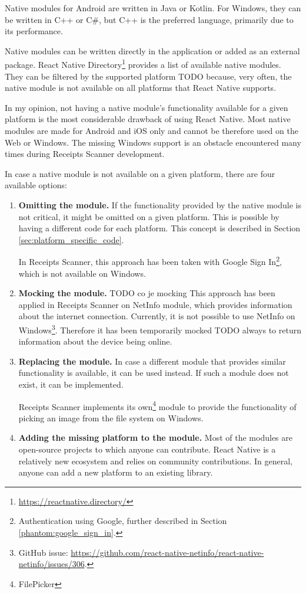 \documentclass[
  digital, %
  table,   %
  oneside, %
  lof,     %
  lot,     %
]{fithesis3}
\begin{document}
Native modules for Android are written in Java or Kotlin.
For Windows, they can be written in C++ or C\#, but C++ is the preferred language, primarily due to its performance.

Native modules can be written directly in the application or added as an external package. React Native Directory\footnote{\url{https://reactnative.directory/}} provides a list of available native modules. They can be filtered by the supported platform TODO because, very often, the native module is not available on all platforms that React Native supports.

In my opinion, not having a native module's functionality available for a given platform is the most considerable drawback of using React Native.
Most native modules are made for Android and iOS only and cannot be therefore used on the Web or Windows. The missing Windows support is an obstacle encountered many times during Receipts Scanner development.

In case a native module is not available on a given platform, there are four available options:
\begin{enumerate}
    \item \textbf{Omitting the module.} 
    If the functionality provided by the native module is not critical, it might be omitted on a given platform. This is possible by having a different code for each platform. This concept is described in Section \ref{sec:platform_specific_code}.
    
    In Receipts Scanner, this approach has been taken with Google Sign In\footnote{Authentication using Google, further described in Section \ref{phantom:google_sign_in}.}, which is not available on Windows.
    
    \item \textbf{Mocking the module.}
    TODO co je mocking
    This approach has been applied in Receipts Scanner on NetInfo module, which provides information about the internet connection. Currently, it is not possible to use NetInfo on Windows\footnote{GitHub issue: \url{https://github.com/react-native-netinfo/react-native-netinfo/issues/306}.}. Therefore it has been temporarily mocked TODO always to return information about the device being online.
    
    \item \textbf{Replacing the module.} In case a different module that provides similar functionality is available, it can be used instead. If such a module does not exist, it can be implemented.
    
    Receipts Scanner implements its own\footnote{FilePicker} module to provide the functionality of picking an image from the file system on Windows.
    
    \item \textbf{Adding the missing platform to the module.}
    Most of the modules are open-source projects to which anyone can contribute. React Native is a relatively new ecosystem and relies on community contributions. In general, anyone can add a new platform to an existing library.
\end{enumerate}
\end{document}
